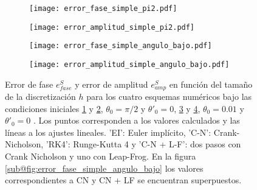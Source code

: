 \documentclass[aps,prb,twocolumn,superscriptaddress,floatfix,longbibliography]{revtex4-2}
\newcounter{para}
\begin{document}

\onecolumngrid


\begin{figure}
  \centering
  \begin{subfigure}[b]{0.45\textwidth}
      \centering
      \texttt{[image: error\_fase\_simple\_pi2.pdf]}
      \caption{\label{fig:error_fase_simple_pi2}}
  \end{subfigure}
  \hfill
  \begin{subfigure}[b]{0.45\textwidth}
      \centering
      \texttt{[image: error\_amplitud\_simple\_pi2.pdf]}
      \caption{\label{fig:error_amplitud_simple_pi2}}
  \end{subfigure}
  \hfill
  \begin{subfigure}[b]{0.45\textwidth}
      \centering
      \texttt{[image: error\_fase\_simple\_angulo\_bajo.pdf]}
      \caption{\label{fig:error_fase_simple_angulo_bajo}}
  \end{subfigure}
  \hfill
  \begin{subfigure}[b]{0.45\textwidth}
      \centering
      \texttt{[image: error\_amplitud\_simple\_angulo\_bajo.pdf]}
      \caption{\label{fig:error_amplitud_simple_angulo_bajo}}
  \end{subfigure}
     \caption{Error de fase $e^S_{fase}$ y error de amplitud $e^S_{amp}$ en función del tamaño de la discretización $h$ para los cuatro esquemas numéricos bajo las condiciones iniciales \ref{fig:error_fase_simple_pi2} y \ref{fig:error_amplitud_simple_pi2}, $\theta_0 = \pi/2$ y $\theta'_0 = 0$, \ref{fig:error_fase_simple_angulo_bajo} y \ref{fig:error_amplitud_simple_angulo_bajo}, $\theta_0 = 0.01$ y $\theta'_0 = 0$ . Los puntos corresponden a los valores calculados y las líneas a los ajustes lineales. 'EI': Euler implícito, 'C-N': Crank-Nicholson, 'RK4': Runge-Kutta 4 y 'C-N + L-F': dos pasos con Crank Nicholson y uno con Leap-Frog. En la figura \ref{sub@fig:error_fase_simple_angulo_bajo} los valores correspondientes a CN y CN + LF se encuentran superpuestos.}
     \label{fig:simple_error_vs_h}
\end{figure}
\end{document}
